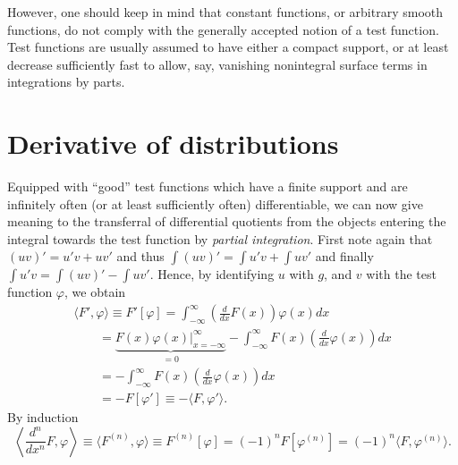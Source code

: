 However, one should keep in mind that constant functions, or arbitrary smooth functions, do not comply with the generally accepted notion of a test function.
Test functions are usually assumed to have either a compact support, or at least decrease sufficiently fast to allow,
say,  vanishing nonintegral surface terms in integrations by parts.

\section{Derivative of distributions}

Equipped with ``good'' test functions
which have a finite support and are
infinitely often (or at least sufficiently often) differentiable,
we can now give meaning to the transferral  of differential quotients from
the objects entering the integral towards the test function by {\em partial integration}.
First note again that $(uv)' = u'v+uv'$
and thus
$\int (uv)' = \int u'v+\int uv'$
and finally   $\int u'v = \int (uv)'  -\int uv'$.
Hence,     by identifying $u$ with $g$, and $v$ with the test function $\varphi$, we obtain
\begin{equation}
\begin{split}
\langle {F}' , \varphi \rangle \equiv {F}'\left[\varphi\right] =
\int_{-\infty}^\infty
\left( \frac{d}{dx} F(x)\right) \varphi (x) dx
\\
\qquad =
\underbrace{\left. F(x) \varphi (x) \right|_{x=-\infty}^\infty}_{=0}
- \int_{-\infty}^\infty
F(x)\left( \frac{d}{dx} \varphi (x) \right) dx \\
\qquad =
- \int_{-\infty}^\infty
F(x)\left( \frac{d}{dx} \varphi (x) \right) dx \\
\qquad =-F\left[\varphi  '\right] \equiv - \langle {F} , \varphi '\rangle .
\end{split}
\end{equation}
By induction
\begin{equation}
\left\langle \frac{d^{n}}{dx^{n}}{F} , \varphi \right\rangle
\equiv
\langle {F}^{(n)} , \varphi \rangle \equiv F^{(n)}\left[\varphi\right]
 = (-1)^n F\left[\varphi  ^{(n)}\right]
 = (-1)^n   \langle {F} , \varphi^{(n)}\rangle.
\end{equation}



